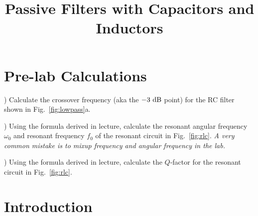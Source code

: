 \documentclass[12pt]{article}
\begin{document}
\title{Passive Filters with Capacitors and Inductors}

\maketitle

\section{Pre-lab Calculations}

) Calculate the crossover frequency (aka the $-3~\rm dB$ point) for the RC filter shown in Fig.~\ref{fig:lowpass}a. \\ \vskip 0.25cm

) Using the formula derived in lecture, calculate the resonant angular frequency $\omega_0$ and resonant frequency $f_0$ of the resonant circuit in Fig.~\ref{fig:rlc}.  {\em A very common mistake is to mixup frequency and angular frequency in the lab.} \\ \vskip 0.25cm

) Using the formula derived in lecture, calculate the $Q$-factor for the resonant circuit in Fig.~\ref{fig:rlc}.

\section{Introduction}
\end{document}
